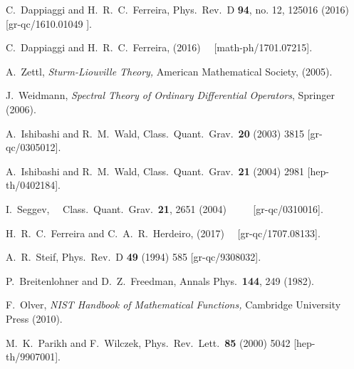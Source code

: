 \documentclass[aps, prd, amsmath, floats, floatfix, twocolumn, nofootinbib, superscriptaddress, showpacs]{revtex4-1}
\begin{document}
\begin{thebibliography}{99}
  C.~Dappiaggi and H.~R.~C.~Ferreira,
  Phys.\ Rev.\ D {\bf 94}, no. 12, 125016 (2016)
  [gr-qc/1610.01049 ].
  
  C.~Dappiaggi and H.~R.~C.~Ferreira,
  (2016)
  [math-ph/1701.07215].

A.~Zettl,
{\it Sturm-Liouville Theory,}
American Mathematical Society, (2005).  

J.~Weidmann,
{\it Spectral Theory of Ordinary Differential Operators},
Springer (2006).

A.~Ishibashi and R.~M.~Wald,
Class.\ Quant.\ Grav.\  {\bf 20} (2003) 3815
[gr-qc/0305012].

A.~Ishibashi and R.~M.~Wald,
Class.\ Quant.\ Grav.\  {\bf 21} (2004) 2981
[hep-th/0402184].

  I.~Seggev,
  Class.\ Quant.\ Grav.\  {\bf 21}, 2651 (2004)
  [gr-qc/0310016].

  H.~R.~C.~Ferreira and C.~A.~R.~Herdeiro,
    (2017)
    [gr-qc/1707.08133].

A.~R.~Steif,
Phys.\ Rev.\ D {\bf 49} (1994) 585
[gr-qc/9308032].

P.~Breitenlohner and D.~Z.~Freedman,
Annals Phys.\  {\bf 144}, 249 (1982).

F.~Olver,
{\it NIST Handbook of Mathematical Functions,}
Cambridge University Press (2010).

M.~K.~Parikh and F.~Wilczek,
Phys.\ Rev.\ Lett.\  {\bf 85} (2000) 5042
[hep-th/9907001].


\end{thebibliography}
\end{document}
